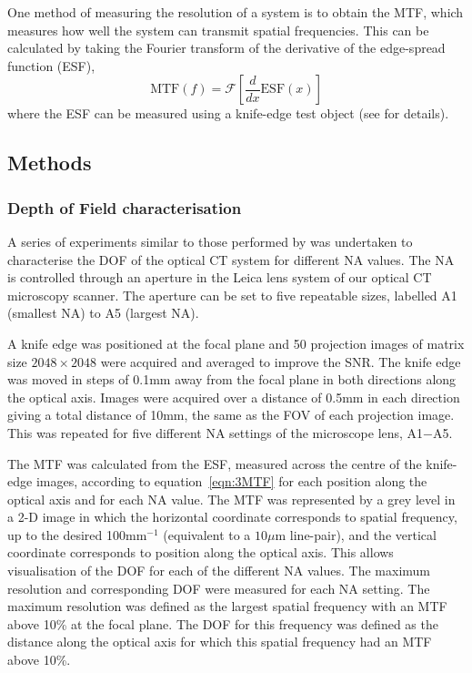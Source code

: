 \documentclass[12pt]{article}
\begin{document}
One method of measuring the resolution of a system is to obtain the MTF, which measures how well the system can transmit spatial frequencies. This can be calculated by taking the Fourier transform of the derivative of the edge-spread function (ESF), 
\begin{equation}
\mathrm{MTF}(f)  = \mathcal{F}\left[\frac{d}{dx}\mathrm{ESF}(x)\right]
\label{eqn:3MTF}
\end{equation}
where the ESF can be measured using a knife-edge test object (see \cite{chenincorporation2012} for details). 

\subsection{Methods}
\subsubsection{Depth of Field characterisation}
A series of experiments similar to those performed by \cite{chenincorporation2012} was undertaken to characterise the DOF of the optical CT system for different NA values. The NA is controlled through an aperture in the Leica lens system of our optical CT microscopy scanner. The aperture can be set to five repeatable sizes, labelled A1 (smallest NA) to A5 (largest NA).

A knife edge was positioned at the focal plane and 50 projection images of matrix size $2048 \times 2048$ were acquired and averaged to improve the SNR. The knife edge was moved in steps of 0.1mm away from the focal plane in both directions along the optical axis. Images were acquired over a distance of 0.5mm in each direction giving a total distance of 10mm, the same as the FOV of each projection image. This was repeated for five different NA settings of the microscope lens, A1−A5.

The MTF was calculated from the ESF, measured across the centre of the knife-edge images, according to equation~\ref{eqn:3MTF} for each position along the optical axis and for each NA value. The MTF was represented by a grey level in a 2-D image in which the horizontal coordinate corresponds to spatial frequency, up to the desired 100mm$^{-1}$ (equivalent to a $10\mu$m line-pair), and the vertical coordinate corresponds to position along the optical axis. This allows visualisation of the DOF for each of the different NA values.
The maximum resolution and corresponding DOF were measured for each NA setting. The maximum resolution was defined as the largest spatial frequency with an MTF above 10\% at the focal plane. The DOF for this frequency was defined as the distance along the optical axis for which this spatial frequency had an MTF above 10\%.  
\end{document}
